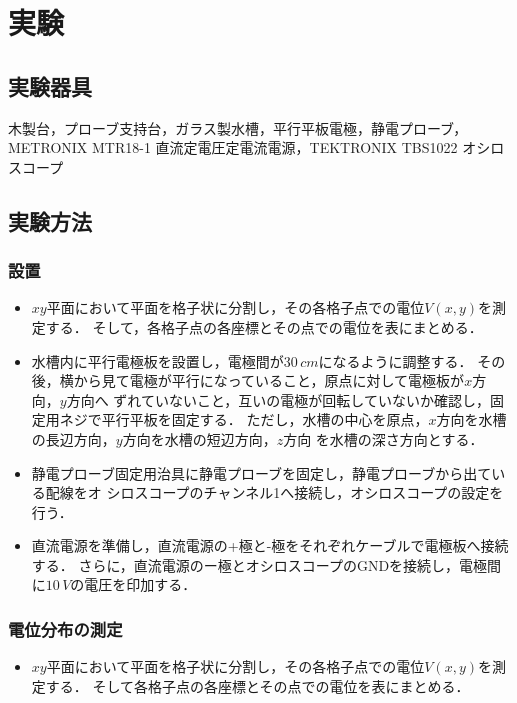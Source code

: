 
\section{実験}

\subsection{実験器具}
木製台，プローブ支持台，ガラス製水槽，平行平板電極，静電プローブ，METRONIX MTR18-1 直流定電圧定電流電源，TEKTRONIX TBS1022 オシロスコープ

\subsection{実験方法}
\subsubsection{設置}
\begin{itemize}
    \item $xy$平面において平面を格子状に分割し，その各格子点での電位$V(x,y)$を測定する．
    そして，各格子点の各座標とその点での電位を表にまとめる．
    \item 水槽内に平行電極板を設置し，電極間が$30\,\si{cm}$になるように調整する．
    その後，横から見て電極が平行になっていること，原点に対して電極板が$x$方向，$y$方向へ
    ずれていないこと，互いの電極が回転していないか確認し，固定用ネジで平行平板を固定する．
    ただし，水槽の中心を原点，$x$方向を水槽の長辺方向，$y$方向を水槽の短辺方向，$z$方向
    を水槽の深さ方向とする．
    \item 静電プローブ固定用治具に静電プローブを固定し，静電プローブから出ている配線をオ
    シロスコープのチャンネル1へ接続し，オシロスコープの設定を行う．
    \item 直流電源を準備し，直流電源の+極と-極をそれぞれケーブルで電極板へ接続する．
    さらに，直流電源のー極とオシロスコープのGNDを接続し，電極間に$10\,V$の電圧を印加する．    
\end{itemize}

\subsubsection{電位分布の測定}
\begin{itemize}
    \item $xy$平面において平面を格子状に分割し，その各格子点での電位$V(x,y)$を測定する．
    そして各格子点の各座標とその点での電位を表にまとめる．
\end{itemize}

